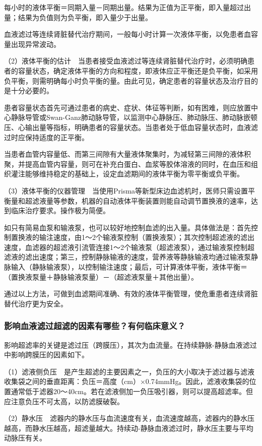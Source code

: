 每小时的液体平衡＝同期入量－同期出量。结果为正值为正平衡，即入量超过出量；结果为负值则为负平衡，即入量少于出量。

血液滤过等连续肾脏替代治疗期间，一般每小时计算一次液体平衡，以免患者血容量出现异常波动。

（2）液体平衡的估计　当患者接受血液滤过等连续肾脏替代治疗时，必须明确患者的容量状态，确定液体平衡的方向和程度，即液体应正平衡还是负平衡，如采用负平衡，则需明确每小时负平衡的量。由此可见，确定患者的容量状态及治疗目的是十分必要的。

患者容量状态首先可通过患者的病史、症状、体征等判断，如有困难，则应放置中心静脉导管或Swan-Ganz肺动脉导管，以监测中心静脉压、肺动脉压、肺动脉嵌顿压、心输出量等指标，明确患者的容量状态。当患者处于低血容量状态时，血液滤过时应保持适度的正平衡。

当患者血管内容量低、而第三间隙有大量液体聚集时，为减轻第三间隙的液体积聚，并提高血管内容量，则可在补充白蛋白、血浆等胶体溶液的同时，在血压和组织灌注能够维持稳定的基础上，设定血滤期间的液体平衡为零平衡或负平衡。

（3）液体平衡的仪器管理　当使用Prisma等新型床边血滤机时，医师只需设置平衡量和超滤液量等参数，机器的自动液体平衡装置则能自动调节置换液的速率，达到临床治疗要求。操作极为简便。

如只有简易血泵和输液泵，也可以较好地控制血滤的出入量。具体做法是：首先控制置换液的输注速度，由1～2个输液泵控制（置换液泵）；其次控制超滤液的滤出速度，血滤器的超滤液引流管连接1～2个输液泵（超滤液泵），通过输液泵控制超滤液的滤出速度；第三，控制静脉输液的速度，营养液等静脉输液均通过输液泵静脉输入（静脉输液泵），以控制输注速度；最后，可计算液体平衡，液体平衡＝（置换液泵量＋静脉输液泵量）－（超滤液泵量＋其他出量）。

通过以上方法，可做到血滤期间准确、有效的液体平衡管理，使危重患者连续肾脏替代治疗更为安全。

\subsubsection{影响血液滤过超滤的因素有哪些？有何临床意义？}

影响超滤率的关键是滤过压（跨膜压），其次为血流量。在持续静脉-静脉血液滤过中影响跨膜压的因素如下。

（1）滤液侧负压　是产生超滤的主要因素之一，负压的大小取决于滤过器与滤液收集袋之间的垂直距离：负压＝高度（cm）×0.74mmHg。因此，滤液收集袋的位置通常低于滤器20～40cm。若在滤液侧加一负压吸引器，则可以提高超滤率。但应注意负压不可太高，以防滤膜破裂。

（2）静水压　滤器内的静水压与血流速度有关，血流速度越高，滤器内的静水压越高，而静水压越高，超滤量越大。持续动-静脉血液滤过时，静水压主要与平均动脉压有关。

